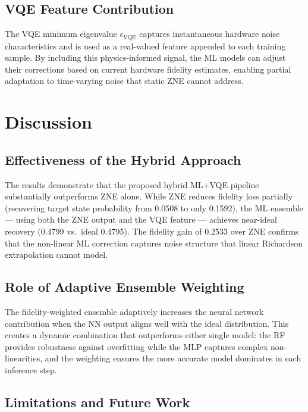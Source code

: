 \documentclass[journal]{IEEEtran}
\begin{document}
\subsection{VQE Feature Contribution}

The VQE minimum eigenvalue $\epsilon_{\text{VQE}}$ captures instantaneous hardware noise characteristics and is used as a real-valued feature appended to each training sample. By including this physics-informed signal, the ML models can adjust their corrections based on current hardware fidelity estimates, enabling partial adaptation to time-varying noise that static ZNE cannot address.

\section{Discussion}

\subsection{Effectiveness of the Hybrid Approach}

The results demonstrate that the proposed hybrid ML+VQE pipeline substantially outperforms ZNE alone. While ZNE reduces fidelity loss partially (recovering target state probability from 0.0508 to only 0.1592), the ML ensemble --- using both the ZNE output and the VQE feature --- achieves near-ideal recovery (0.4799 vs.\ ideal 0.4795). The fidelity gain of 0.2533 over ZNE confirms that the non-linear ML correction captures noise structure that linear Richardson extrapolation cannot model.

\subsection{Role of Adaptive Ensemble Weighting}

The fidelity-weighted ensemble adaptively increases the neural network contribution when the NN output aligns well with the ideal distribution. This creates a dynamic combination that outperforms either single model: the RF provides robustness against overfitting while the MLP captures complex non-linearities, and the weighting ensures the more accurate model dominates in each inference step.

\subsection{Limitations and Future Work}
\end{document}
